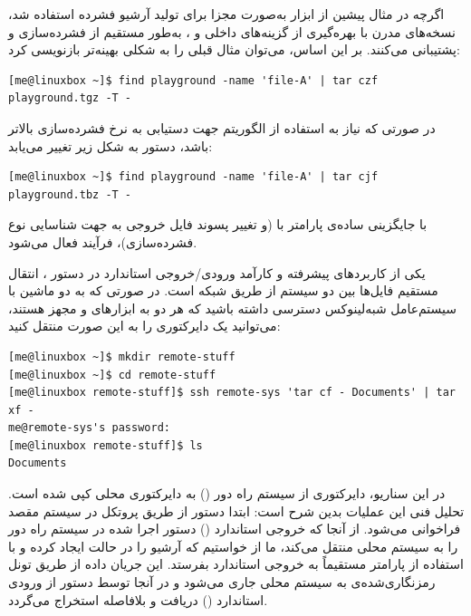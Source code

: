 اگرچه در مثال پیشین از ابزار  به‌صورت مجزا برای تولید آرشیو فشرده استفاده شد، نسخه‌های مدرن  با بهره‌گیری از گزینه‌های داخلی  و ، به‌طور مستقیم از فشرده‌سازی  و  پشتیبانی می‌کنند. بر این اساس، می‌توان مثال قبلی را به شکلی بهینه‌تر بازنویسی کرد:

\begin{latin}
\begin{lstlisting}
[me@linuxbox ~]$ find playground -name 'file-A' | tar czf playground.tgz -T -
\end{lstlisting}
\end{latin}

در صورتی که نیاز به استفاده از الگوریتم  جهت دستیابی به نرخ فشرده‌سازی بالاتر باشد، دستور به شکل زیر تغییر می‌یابد:

\begin{latin}
\begin{lstlisting}
[me@linuxbox ~]$ find playground -name 'file-A' | tar cjf playground.tbz -T -
\end{lstlisting}
\end{latin}

با جایگزینی ساده‌ی پارامتر  با  (و تغییر پسوند فایل خروجی به  جهت شناسایی نوع فشرده‌سازی)، فرآیند  فعال می‌شود.

یکی از کاربردهای پیشرفته و کارآمد ورودی/خروجی استاندارد در دستور ، انتقال مستقیم فایل‌ها بین دو سیستم از طریق شبکه است. در صورتی که به دو ماشین با سیستم‌عامل شبه‌لینوکس دسترسی داشته باشید که هر دو به ابزارهای  و  مجهز هستند، می‌توانید یک دایرکتوری را به این صورت منتقل کنید:

\begin{latin}
\begin{lstlisting}
[me@linuxbox ~]$ mkdir remote-stuff
[me@linuxbox ~]$ cd remote-stuff
[me@linuxbox remote-stuff]$ ssh remote-sys 'tar cf - Documents' | tar xf -
me@remote-sys's password:
[me@linuxbox remote-stuff]$ ls
Documents
\end{lstlisting}
\end{latin}

در این سناریو، دایرکتوری  از سیستم راه دور () به دایرکتوری محلی  کپی شده است. تحلیل فنی این عملیات بدین شرح است: ابتدا دستور  از طریق پروتکل  در سیستم مقصد فراخوانی می‌شود. از آنجا که  خروجی استاندارد () دستور اجرا شده در سیستم راه دور را به سیستم محلی منتقل می‌کند، ما از  خواستیم که آرشیو را در حالت  ایجاد کرده و با استفاده از پارامتر  مستقیماً به خروجی استاندارد بفرستد. این جریان داده از طریق تونل رمزنگاری‌شده‌ی  به سیستم محلی جاری می‌شود و در آنجا توسط دستور  از ورودی استاندارد () دریافت و بلافاصله استخراج می‌گردد.

